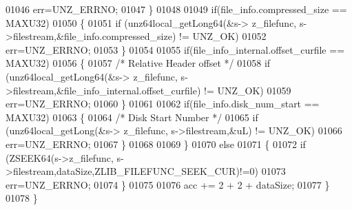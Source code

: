 \begin{DoxyCode}
01046                                                                                         err=UNZ\_ERRNO;
01047                                                                 \}
01048 
01049                                                                 \textcolor{keywordflow}{if}(file\_info.compressed\_size == MAXU32)
01050                                                                 \{
01051                                                                         \textcolor{keywordflow}{if} (unz64local\_getLong64(&s->
      z\_filefunc, s->filestream,&file\_info.compressed\_size) != UNZ\_OK)
01052                                                                                   err=UNZ\_ERRNO;
01053                                                                 \}
01054 
01055                                                                 \textcolor{keywordflow}{if}(file\_info\_internal.offset\_curfile == 
      MAXU32)
01056                                                                 \{
01057                                                                         \textcolor{comment}{/* Relative Header offset */}
01058                                                                         \textcolor{keywordflow}{if} (unz64local\_getLong64(&s->
      z\_filefunc, s->filestream,&file\_info\_internal.offset\_curfile) != UNZ\_OK)
01059                                                                                 err=UNZ\_ERRNO;
01060                                                                 \}
01061 
01062                                                                 \textcolor{keywordflow}{if}(file\_info.disk\_num\_start == MAXU32)
01063                                                                 \{
01064                                                                         \textcolor{comment}{/* Disk Start Number */}
01065                                                                         \textcolor{keywordflow}{if} (unz64local\_getLong(&s->
      z\_filefunc, s->filestream,&uL) != UNZ\_OK)
01066                                                                                 err=UNZ\_ERRNO;
01067                                                                 \}
01068 
01069             \}
01070             \textcolor{keywordflow}{else}
01071             \{
01072                 \textcolor{keywordflow}{if} (ZSEEK64(s->z\_filefunc, s->filestream,dataSize,ZLIB\_FILEFUNC\_SEEK\_CUR)!=0)
01073                     err=UNZ\_ERRNO;
01074             \}
01075 
01076             acc += 2 + 2 + dataSize;
01077         \}
01078     \}

\end{DoxyCode}
